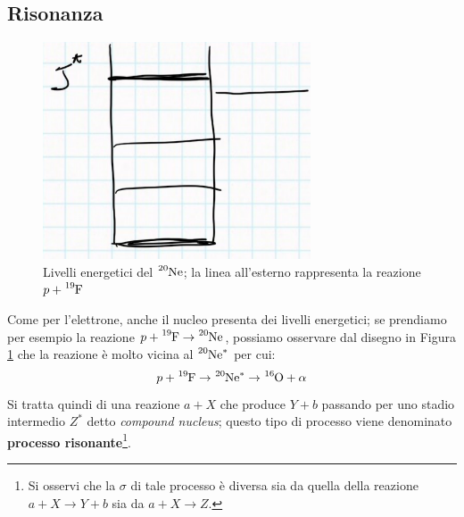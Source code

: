 \subsection{Risonanza}
\begin{figure}[h]
    \centering
    \includegraphics[scale=0.9]{Immagini/0325_lv.png}
    \caption{Livelli energetici del $\ce{^{20}Ne}$; la linea all'esterno rappresenta la reazione $p+\ce{^{19}F}$}
    \label{0325_lv}
\end{figure}
\noindent Come per l'elettrone, anche il nucleo presenta dei livelli energetici; se prendiamo per esempio la reazione $p+\ce{^{19}F}\to\ce{^{20}Ne}$, possiamo osservare dal disegno in Figura \ref{0325_lv} che la reazione è molto vicina al $\ce{^{20}Ne}^*$ per cui:
$$p+\ce{^{19}F}\to\ce{^{20}Ne}^*\to \ce{^{16}O} + \alpha$$
Si tratta quindi di una reazione $a+X$ che produce $Y+b$ passando per uno stadio intermedio $Z^*$ detto \textit{compound nucleus}; questo tipo di processo viene denominato \textbf{processo risonante}\footnote{Si osservi che la $\sigma$ di tale processo è diversa sia da quella della reazione $a+X\to Y+b$ sia da $a+X\to Z$.}.

